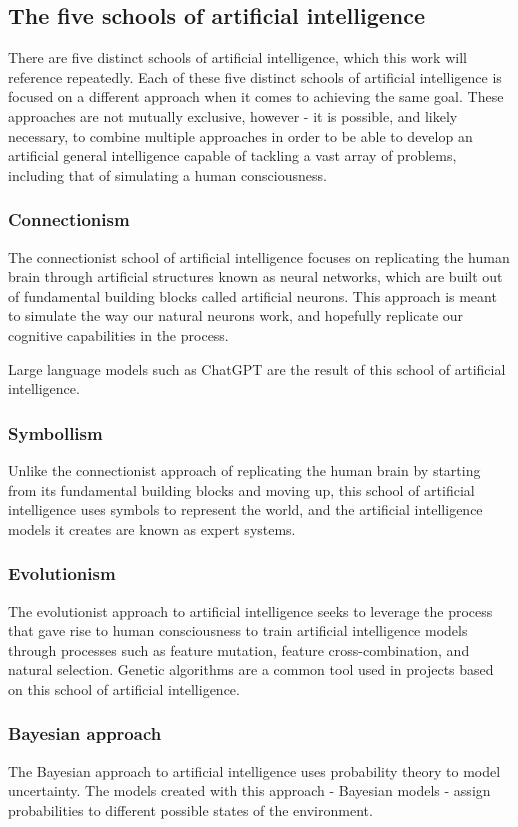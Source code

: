\documentclass[masterthesis]{fer}
\begin{document}
\subsection{The five schools of artificial intelligence}
There are five distinct schools of artificial intelligence, which this work will reference repeatedly.
   Each of these five distinct schools of artificial intelligence is focused on a different approach when it comes to achieving the same goal. These approaches are not mutually exclusive, however - it is possible, and likely necessary, to combine multiple approaches in order to be able to develop an artificial general intelligence capable of tackling a vast array of problems, including that of simulating a human consciousness.
\subsubsection{Connectionism}
The connectionist school of artificial intelligence focuses on replicating the human brain through artificial structures known as neural networks, which are built out of fundamental building blocks called artificial neurons. This approach is meant to simulate the way our natural neurons work, and hopefully replicate our cognitive capabilities in the process.

Large language models such as ChatGPT are the result of this school of artificial intelligence.
\subsubsection{Symbollism}
Unlike the connectionist approach of replicating the human brain by starting from its fundamental building blocks and moving up, this school of artificial intelligence uses symbols to represent the world, and the artificial intelligence models it creates are known as expert systems.
\subsubsection{Evolutionism}
The evolutionist approach to artificial intelligence seeks to leverage the process that gave rise to human consciousness to train artificial intelligence models through processes such as feature mutation, feature cross-combination, and natural selection. Genetic algorithms are a common tool used in projects based on this school of artificial intelligence.
\subsubsection{Bayesian approach}
The Bayesian approach to artificial intelligence uses probability theory to model uncertainty. The models created with this approach - Bayesian models - assign probabilities to different possible states of the environment.
\end{document}
